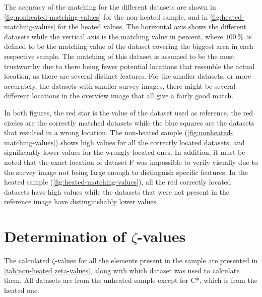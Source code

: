 The accuracy of the matching for the different datasets are shown in \cref{fig:nonheated-matching-values} for the non-heated sample, and in \cref{fig:heated-matching-values} for the heated values. The horizontal axis shows the different datasets while the vertical axis is the matching value in percent, where $\SI{100}{\percent}$ is defined to be the matching value of the dataset covering the biggest area in each respective sample. The matching of this dataset is assumed to be the most trustworthy due to there being fewer potential locations that resemble the actual location, as there are several distinct features. For the smaller datasets, or more accurately, the datasets with smaller survey images, there might be several different locations in the overview image that all give a fairly good match.

In both figures, the red star is the value of the dataset used as reference, the red circles are the correctly matched datasets while the blue squares are the datasets that resulted in a wrong location. The non-heated sample (\cref{fig:nonheated-matching-values}) shows high values for all the correctly located datasets, and significantly lower values for the wrongly located ones. In addition, it must be noted that the exact location of dataset F was impossible to verify visually due to the survey image not being large enough to distinguish specific features. In the heated sample (\cref{fig:heated-matching-values}), all the red correctly located datasets have high values while the datasets that were not present in the reference image have distinguishably lower values.

\section{Determination of $\zeta$-values}

The calculated $\zeta$-values for all the elements present in the sample are presented in \cref{tab:non-heated zeta-values}, along with which dataset was used to calculate them. All datasets are from the unheated sample except for C*, which is from the heated one.

